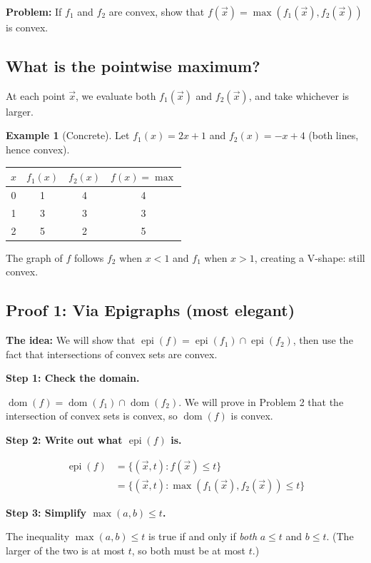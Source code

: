 \documentclass[10pt]{article}
\theoremstyle{definition}
\newtheorem{example}{Example}
\theoremstyle{plain}
\DeclareMathOperator{\dom}{dom}
\DeclareMathOperator{\epi}{epi}
\begin{document}
\textbf{Problem:} If $f_1$ and $f_2$ are convex, show that $f(\vec{x}) = \max(f_1(\vec{x}), f_2(\vec{x}))$ is convex.

\subsection{What is the pointwise maximum?}

At each point $\vec{x}$, we evaluate both $f_1(\vec{x})$ and $f_2(\vec{x})$, and take whichever is larger.

\begin{example}[Concrete]
Let $f_1(x) = 2x + 1$ and $f_2(x) = -x + 4$ (both lines, hence convex).
\begin{center}
\begin{tabular}{@{}cccc@{}}
\toprule
$x$ & $f_1(x)$ & $f_2(x)$ & $f(x) = \max$ \\
\midrule
0 & 1 & 4 & 4 \\
1 & 3 & 3 & 3 \\
2 & 5 & 2 & 5 \\
\bottomrule
\end{tabular}
\end{center}
The graph of $f$ follows $f_2$ when $x < 1$ and $f_1$ when $x > 1$, creating a V-shape: still convex.
\end{example}

\subsection{Proof 1: Via Epigraphs (most elegant)}

\textbf{The idea:} We will show that $\epi(f) = \epi(f_1) \cap \epi(f_2)$, then use the fact that intersections of convex sets are convex.

\textbf{Step 1: Check the domain.}

$\dom(f) = \dom(f_1) \cap \dom(f_2)$. We will prove in Problem 2 that the intersection of convex sets is convex, so $\dom(f)$ is convex. \checkmark

\textbf{Step 2: Write out what $\epi(f)$ is.}

\begin{align*}
    \epi(f) &= \{(\vec{x}, t) : f(\vec{x}) \le t\} \\
            &= \{(\vec{x}, t) : \max(f_1(\vec{x}), f_2(\vec{x})) \le t\}
\end{align*}

\textbf{Step 3: Simplify $\max(a, b) \le t$.}

The inequality $\max(a, b) \le t$ is true if and only if \emph{both} $a \le t$ and $b \le t$. (The larger of the two is at most $t$, so both must be at most $t$.)
\end{document}
